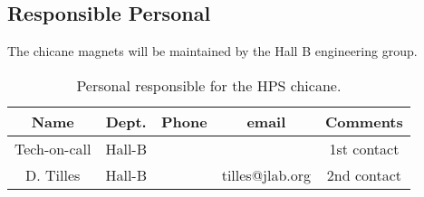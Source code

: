 \subsection{Responsible Personal}

The chicane magnets will be maintained by the Hall B engineering group.  

 \begin{table}[!ht]
 \centering
 \begin{tabular}{|c|c|c|c|c|}
\hline
 Name&Dept.&Phone&email&Comments \\ \hline
 Tech-on-call & Hall-B&&& 1st contact  \\ \hline
 D. Tilles & Hall-B&&tilles@jlab.org&2nd contact \\ \hline
  \end{tabular}
\caption{ Personal responsible for the HPS chicane.} 
\label{tb:beam}
\end{table}
